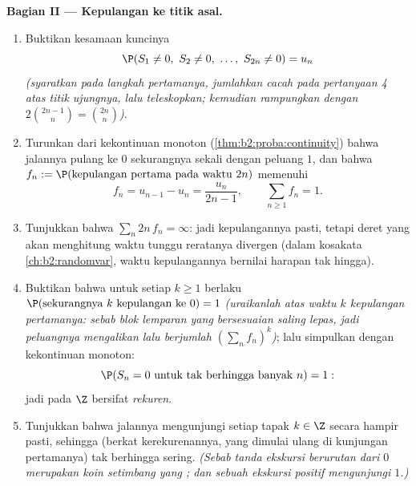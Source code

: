 \begin{problem}
\medskip
\noindent\textbf{Bagian II --- Kepulangan ke titik asal.}
\begin{enumerate}[resume]
  \item Buktikan kesamaan kuncinya
        \[
        \P(S_1 \neq 0,\ S_2 \neq 0,\ \dots,\ S_{2n} \neq 0) =
        u_n
        \]
        \emph{(syaratkan pada langkah pertamanya, jumlahkan cacah pada
        pertanyaan 4 atas titik ujungnya, lalu teleskopkan; kemudian rampungkan
        dengan $2\binom{2n-1}{n} = \binom{2n}{n}$)}.
  \item Turunkan dari kekontinuan monoton
        (\cref{thm:b2:proba:continuity}) bahwa jalannya
        pulang ke $0$ sekurangnya sekali dengan peluang $1$,
        dan bahwa $f_n := \P(\text{kepulangan pertama pada waktu }2n)$
        memenuhi
        \[
        f_n = u_{n-1} - u_n = \frac{u_n}{2n-1},
        \qquad \sum_{n\geq1}f_n = 1 .
        \]
  \item Tunjukkan bahwa $\sum_n 2n\,f_n = \infty$: jadi kepulangannya
        pasti, tetapi deret yang akan menghitung waktu tunggu
        reratanya divergen (dalam kosakata
        \cref{ch:b2:randomvar}, waktu kepulangannya
        bernilai harapan tak hingga).
  \item Buktikan bahwa untuk setiap $k \geq 1$ berlaku $\P(\text{sekurangnya }
        k\text{ kepulangan ke }0) = 1$ \emph{(uraikanlah atas
        waktu $k$ kepulangan pertamanya: sebab blok lemparan yang
        bersesuaian saling lepas, jadi peluangnya
        mengalikan lalu berjumlah $(\sum_nf_n)^k$)}; lalu simpulkan dengan
        kekontinuan monoton:
        \[
        \P(S_n = 0 \text{ untuk tak berhingga banyak } n) = 1 :
        \]
        jadi  pada $\Z$ bersifat \emph{rekuren}.
  \item Tunjukkan bahwa jalannya mengunjungi setiap tapak $k \in \Z$
        secara hampir pasti, sehingga (berkat kerekurenannya, yang dimulai ulang di
        kunjungan pertamanya) tak berhingga sering. \emph{(Sebab tanda
        ekskursi berurutan dari $0$ merupakan koin setimbang yang ; dan sebuah ekskursi positif mengunjungi $1$.)}
\end{enumerate}


\end{problem}
